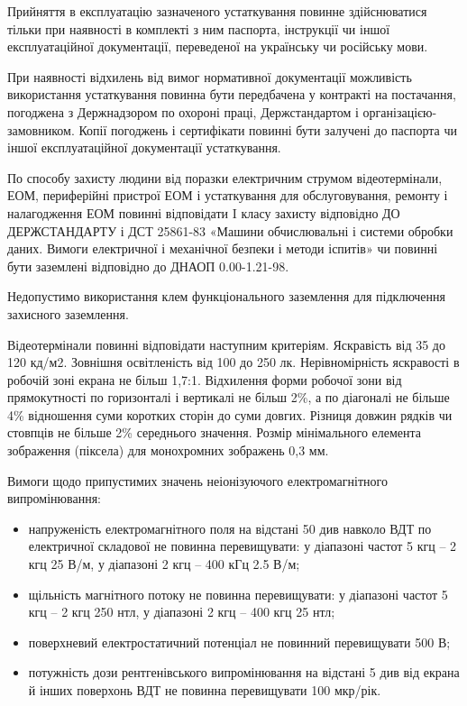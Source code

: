 \documentclass[simple,a4paper,14pt,ukrainian,utf8]{eskdtext}
\begin{document}
\begin{appendices}
                Прийняття в експлуатацію зазначеного устаткування повинне здійснюватися тільки при наявності в комплекті з ним паспорта, інструкції чи іншої експлуатаційної документації, переведеної на українську чи російську мови.

                При наявності відхилень від вимог нормативної документації можливість використання устаткування повинна бути передбачена у контракті на постачання, погоджена з Держнадзором по охороні праці, Держстандартом і організацією-замовником. Копії погоджень і сертифікати повинні бути залучені до паспорта чи іншої експлуатаційної документації устаткування.

                По способу захисту людини від поразки електричним струмом відеотермінали, ЕОМ, периферійні пристрої ЕОМ і устаткування для обслуговування, ремонту і налагодження ЕОМ повинні відповідати I класу захисту відповідно ДО ДЕРЖСТАНДАРТУ і ДСТ 25861-83 «Машини обчислювальні і системи обробки даних. Вимоги електричної і механічної безпеки і методи іспитів» чи повинні бути заземлені відповідно до ДНАОП 0.00-1.21-98.

                Недопустимо використання клем функціонального заземлення для підключення захисного заземлення.

                Відеотермінали повинні відповідати наступним критеріям. Яскравість від 35 до 120 кд/м2. Зовнішня освітленість від 100 до 250 лк. Нерівномірність яскравості в робочій зоні екрана не більш 1,7:1. Відхилення форми робочої зони від прямокутності по горизонталі і вертикалі не більш 2\%, а по діагоналі не більше 4\% відношення суми коротких сторін до суми довгих. Різниця довжин рядків чи стовпців не більше 2\% середнього значення. Розмір мінімального елемента зображення (піксела) для монохромних зображень 0,3 мм.

                Вимоги щодо припустимих значень неіонізуючого електромагнітного випромінювання:

                \begin{itemize}
                    \item напруженість електромагнітного поля на відстані 50 див навколо ВДТ по електричної складової не повинна перевищувати: у діапазоні частот 5 кгц -- 2 кгц 25 В/м, у діапазоні 2 кгц -- 400 кГц 2.5 В/м;
                    \item щільність магнітного потоку не повинна перевищувати: у діапазоні частот 5 кгц -- 2 кгц 250 нтл, у діапазоні 2 кгц -- 400 кгц 25 нтл;
                    \item поверхневий електростатичний потенціал не повинний перевищувати 500 В;
                    \item потужність дози рентгенівського випромінювання на відстані 5 див від екрана й інших поверхонь ВДТ не повинна перевищувати 100 мкр/рік.
                \end{itemize}


\end{appendices}
\end{document}
